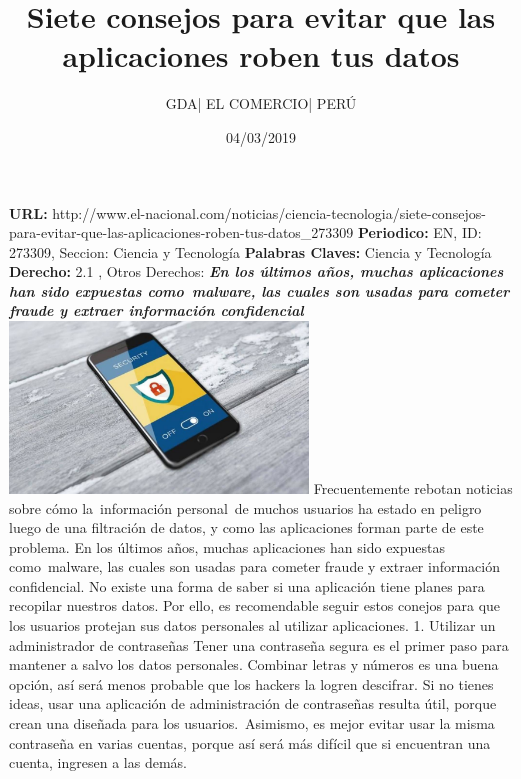 \documentclass{article}%
\title{\textbf{Siete consejos para evitar que las aplicaciones roben tus datos}}%
\author{GDA| EL COMERCIO| PERÚ}%
\date{04/03/2019}%
\begin{document}
%
\normalsize%
\maketitle%
\textbf{URL: }%
http://www.el{-}nacional.com/noticias/ciencia{-}tecnologia/siete{-}consejos{-}para{-}evitar{-}que{-}las{-}aplicaciones{-}roben{-}tus{-}datos\_273309\newline%
%
\textbf{Periodico: }%
EN, %
ID: %
273309, %
Seccion: %
Ciencia y Tecnología\newline%
%
\textbf{Palabras Claves: }%
Ciencia y Tecnología\newline%
%
\textbf{Derecho: }%
2.1%
, Otros Derechos: %
\newline%
%
\textbf{\textit{En los últimos años, muchas aplicaciones han sido expuestas como~malware, las cuales son usadas para cometer fraude y extraer información confidencial}}%
\newline%
\newline%
%
\includegraphics[width=300px]{EN_273309.jpg}%
\newline%
%
Frecuentemente rebotan noticias sobre cómo la~información personal~de muchos usuarios ha estado en peligro luego de una filtración de datos, y como las aplicaciones forman parte de este problema. En los últimos años, muchas aplicaciones han sido expuestas como~malware, las cuales son usadas para cometer fraude y extraer información confidencial.%
\newline%
%
No existe una forma de saber si una aplicación tiene planes para recopilar nuestros datos. Por ello, es recomendable seguir estos conejos para que los usuarios protejan sus datos personales al utilizar aplicaciones.%
\newline%
%
1. Utilizar un administrador de contraseñas%
\newline%
%
Tener una contraseña segura es el primer paso para mantener a salvo los datos personales. Combinar letras y números es una buena opción, así será menos probable que los hackers la logren descifrar.%
\newline%
%
Si no tienes ideas, usar una aplicación de administración de contraseñas resulta útil, porque crean una diseñada para los usuarios.~Asimismo, es mejor evitar usar la misma contraseña en varias cuentas, porque así será más difícil que si encuentran una cuenta, ingresen a las demás.%
\end{document}
